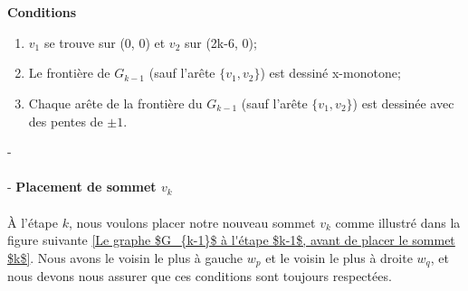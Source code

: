 \documentclass[hidelinks,letterpaper,12pt]{article}
\begin{document}
\\ \\
\textbf{Conditions}
\label{Conditions}
\begin{enumerate}
\item $v_1$ se trouve sur (0, 0) et $v_2$ sur (2k-6, 0);
\item Le frontière de $G_{k-1}$ (sauf l'arête $\{v_1, v_2\}$) est dessiné x-monotone;	
\item Chaque arête de la frontière du $G_{k-1}$ (sauf l'arête $\{v_1, v_2\}$) est dessinée avec des pentes de $\pm 1$. 
\end{enumerate} 
{\color{white}-} 
\\ \\
{\color{white}-} 
\textbf{Placement de sommet $v_k$}
\\ \\ 
À l'étape $k$, nous voulons placer notre nouveau sommet $v_k$ comme illustré dans la figure suivante \ref{Le graphe $G_{k-1}$ à l'étape $k-1$, avant de placer le sommet $k$}. Nous avons le voisin le plus à gauche $w_p$ et le voisin le plus à droite $w_q$, et nous devons nous assurer que ces conditions sont toujours respectées. 
\\
\end{document}
